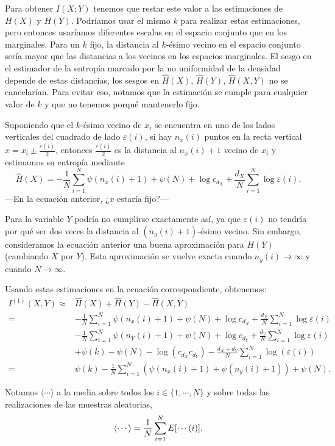 \documentclass[10pt,a4paper]{article} %
\let\mathbb\relax
\theoremstyle{definition}
\begin{document}
Para obtener $I(X;Y)$ tenemos que restar este valor a las estimaciones de $H(X)$ y $H(Y)$. Podríamos usar el mismo $k$ para realizar estas estimaciones, pero entonces usaríamos diferentes escalas en el espacio conjunto que en los marginales. Para un $k$ fijo, la distancia al $k$-ésimo vecino en el espacio conjunto sería mayor que las distancias a los vecinos en los espacios marginales. El sesgo en el estimador de la entropía marcado por la no uniformidad de la densidad depende de estas distancias, los sesgos en $\widehat{H}(X)$, $\widehat{H}(Y)$, $\widehat{H}(X,Y)$ no se cancelarían. Para evitar eso, notamos que la estimación se cumple para cualquier valor de $k$ y que no tenemos porqué mantenerlo fijo.

Suponiendo que el $k$-ésimo vecino de $x_i$ se encuentra en uno de los lados verticales del cuadrado de lado $\varepsilon(i)$, si hay $n_x(i)$ puntos en la recta vertical $x = x_i \pm \frac{\varepsilon(i)}{2}$, entonces $\frac{\varepsilon(i)}{2}$ es la distancia al $n_x(i) + 1$ vecino de $x_i$ y estimamos su entropía mediante\[
\widehat{H}(X) = - \frac{1}{N}\sum_{i=1}^N\psi(n_x(i)+1) + \psi(N) + \log c_{d_X} + \frac{d_X}{N} \sum_{i=1}^N\log \varepsilon(i).
\]
---En la ecuación anterior, ¿$x$ estaría fijo?---

Para la variable $Y$ podría no cumplirse exactamente así, ya que $\varepsilon(i)$ no tendría por qué ser dos veces la distancia al $(n_y(i)+1)$-ésimo vecino. Sin embargo, consideramos la ecuación anterior una buena aproximación para $H(Y)$ (cambiando $X$ por $Y$). Esta aproximación se vuelve exacta cuando $n_y(i) \to \infty$ y cuando $N\to \infty$.

Usando estas estimaciones en la ecuación correspondiente, obtenemos:
\begin{align*}
  I^{(1)}(X,Y) \approx & \widehat{H}(X) + \widehat{H}(Y) - \widehat{H}(X, Y)\\ =& - \frac{1}{N}\sum_{i=1}^N\psi(n_x(i)+1) + \psi(N) + \log c_{d_X} + \frac{d_X}{N} \sum_{i=1}^N\log \varepsilon(i)\\
  & - \frac{1}{N}\sum_{i=1}^N\psi(n_Y(i)+1) + \psi(N) + \log c_{d_Y} + \frac{d_Y}{N} \sum_{i=1}^N\log \varepsilon(i)\\
  & + \psi(k) - \psi(N) - \log (c_{d_X}c_{d_Y}) - \frac{d_X+d_Y}{N} \sum_{i=1}^N\log(\varepsilon(i))\\
  =& \psi(k) - \frac{1}{N}\sum_{i=1}^N\left( \psi(n_x(i)+1) + \psi(n_y(i)+1) \right ) + \psi(N).
\end{align*}

Notamos $\langle \cdots \rangle$ a la media sobre todos los $i\in\{1,\cdots,N\}$ y sobre todas las realizaciones de las muestras aleatorias,\[
\langle \cdots \rangle = \frac{1}{N} \sum_{i=1}^N\mathbb{E}[\cdots(i)].
\]
\end{document}
